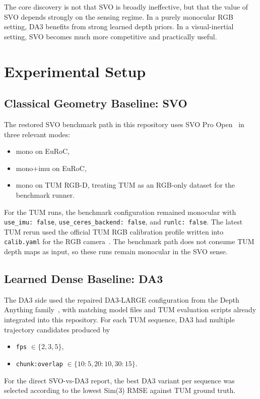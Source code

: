 \documentclass[conference]{IEEEtran}
\begin{document}
The core discovery is not that SVO is broadly ineffective, but that the value of SVO depends strongly on the sensing regime. In a purely monocular RGB setting, DA3 benefits from strong learned depth priors. In a visual-inertial setting, SVO becomes much more competitive and practically useful.

\section{Experimental Setup}

\subsection{Classical Geometry Baseline: SVO}
The restored SVO benchmark path in this repository uses SVO Pro Open~\cite{forster2017svo} in three relevant modes:
\begin{itemize}
\item mono on EuRoC,
\item mono+imu on EuRoC,
\item mono on TUM RGB-D, treating TUM as an RGB-only dataset for the benchmark runner.
\end{itemize}

For the TUM runs, the benchmark configuration remained monocular with
\texttt{use\_imu: false}, \texttt{use\_ceres\_backend: false}, and \texttt{runlc: false}. The latest TUM rerun used the official TUM RGB calibration profile written into \texttt{calib.yaml} for the RGB camera~\cite{tumrgbdformats}. The benchmark path does not consume TUM depth maps as input, so these runs remain monocular in the SVO sense.

\subsection{Learned Dense Baseline: DA3}
The DA3 side used the repaired DA3-LARGE configuration from the Depth Anything family~\cite{yang2024depthanything}, with matching model files and TUM evaluation scripts already integrated into this repository. For each TUM sequence, DA3 had multiple trajectory candidates produced by
\begin{itemize}
\item \texttt{fps} $\in \{2,3,5\}$,
\item \texttt{chunk:overlap} $\in \{10{:}5,20{:}10,30{:}15\}$.
\end{itemize}

For the direct SVO-vs-DA3 report, the best DA3 variant per sequence was selected according to the lowest Sim(3) RMSE against TUM ground truth.
\end{document}
